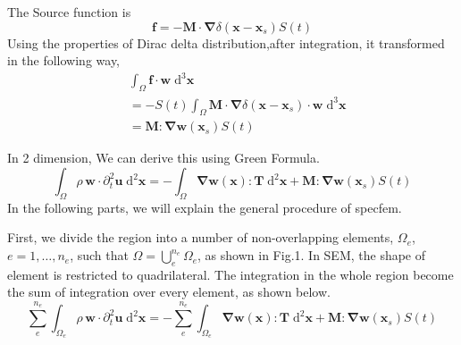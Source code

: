 \documentclass{book}
\begin{document}
The Source function is 
\begin{equation}
 \boldsymbol{f} = -\boldsymbol{M}\cdot\boldsymbol\nabla\delta(\boldsymbol x-\boldsymbol x_s)S(t)
\end{equation}
Using the properties of Dirac delta distribution,after integration, it transformed in the following way,
\begin{equation}
\begin{aligned}
 &\int_\Omega \boldsymbol f\cdot \boldsymbol w\;\mathrm{d}^3\boldsymbol x\\
 &= -S(t)\int_\Omega\boldsymbol{M}\cdot \boldsymbol\nabla\delta(\boldsymbol x-\boldsymbol x_s)\cdot \boldsymbol w\;\mathrm{d}^3\boldsymbol x\\
 &= \boldsymbol{M}:\boldsymbol{\nabla w}(\boldsymbol x_s)S (t)
\end{aligned}
\end{equation}

In 2 dimension, We can derive this using Green Formula. 
\begin{equation}
 \int_\Omega \rho\,\boldsymbol w\cdot \partial_t^2\boldsymbol u\;\mathrm{d}^2\boldsymbol x = -\int_\Omega \boldsymbol{\nabla}\boldsymbol w(\boldsymbol x): \boldsymbol T\;\mathrm{d}^2\boldsymbol x + \boldsymbol{M}:\boldsymbol{\nabla w}(\boldsymbol x_s)S (t)
\end{equation}
In the following parts, we will explain the general procedure of specfem.

First, we divide the region into  a number of non-overlapping elements, $\Omega_e$, $e=1, \ldots, n_e$, such that $\Omega=\bigcup_e^{n_e}\Omega_e$, as shown in Fig.1. In SEM, the shape of element is restricted to quadrilateral. The integration in the whole region become the sum of integration over every element, as shown below.
\begin{equation}
 \sum_e^{n_e}\int_{\Omega_e}  \rho\,\boldsymbol w\cdot \partial_t^2\boldsymbol u\;\mathrm{d}^2\boldsymbol x = -\sum_e^{n_e}\int_{\Omega_e} \boldsymbol{\nabla}\boldsymbol w(\boldsymbol x): \boldsymbol T\;\mathrm{d}^2\boldsymbol x + \boldsymbol{M}:\boldsymbol{\nabla w}(\boldsymbol x_s)S (t)
\end{equation}
\end{document}
